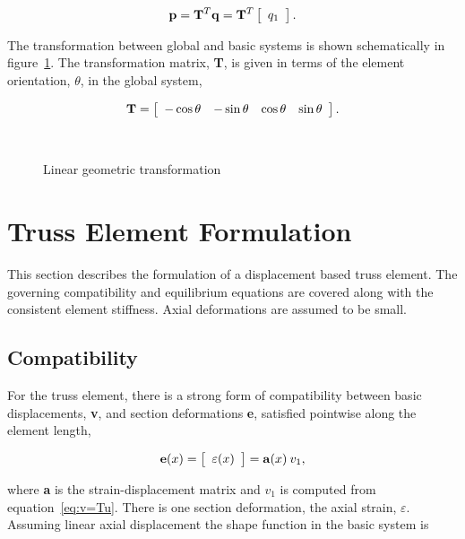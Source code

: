 \documentclass[12pt]{article}
\begin{document}
\begin{equation}
\label{eq:p=Tq}
{\bf p} = {\bf T}^T{\bf q} = {\bf T}^T \left[ \begin{array}{c} q_1 \end{array} \right].
\end{equation}

The transformation between global and basic systems is shown schematically in
figure~\ref{fig:TrussTransf}. The transformation matrix, {\bf T}, is given in terms
of the element orientation, $\theta$, in the global system,

\begin{equation}
{\bf T} = \left[ \begin{array}{cccc} -\cos\theta & -\sin\theta & \cos\theta & \sin\theta
\end{array} \right].
\end{equation}

\begin{figure}[htpb]
\begin{center}
\leavevmode
\hbox{%
\epsfxsize=6.0in
}
\end{center}
\caption{Linear geometric transformation}
\label{fig:TrussTransf}
\end{figure}

\section{Truss Element Formulation}
This section describes the formulation of a displacement based truss element.
The governing compatibility and equilibrium equations are covered along with the consistent
element stiffness. Axial deformations are assumed to be small.

\subsection{Compatibility}
For the truss element, there is a strong form of compatibility between
basic displacements, {\bf v}, and section deformations {\bf e}, satisfied
pointwise along the element length,

\begin{equation}
\label{eq:e=av}
{\bf e}(x) =
\left[ \begin{array}{c} \varepsilon(x) \end{array} \right] =
{\bf a}(x) \: v_1,
\end{equation}

\noindent where {\bf a} is the strain-displacement matrix and $v_1$ is computed
from equation~\ref{eq:v=Tu}. There is one section deformation,
the axial strain, $\varepsilon$. Assuming linear axial
displacement the shape function in the basic system is
\end{document}
